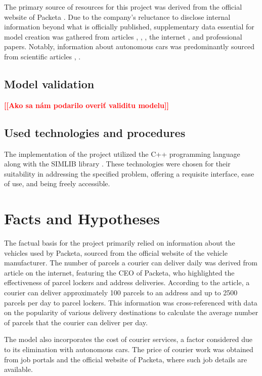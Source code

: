 \documentclass[a4paper, 11pt, a4paper]{article}
\newcommand{\todo}[1]{\textcolor{red}{\textbf{[[#1]]}}}
\begin{document}
The primary source of resources for this project was derived from the official website of Packeta \cite{packeta}.
Due to the company's reluctance to disclose internal information beyond what is officially published,
supplementary data essential for model creation was gathered from articles \cite{delivery.distance}, \cite{delivery.percentage},
\cite{parcels.num}, the internet \cite{peugeot}, and professional papers.
Notably, information about autonomous cars was predominantly sourced from scientific articles \cite{autonomous.emissions}, \cite{autonomous.models}.


\subsection{Model validation}

\noindent\todo{Ako sa nám podarilo overiť validitu modelu}


\subsection{Used technologies and procedures}

The implementation of the project utilized the C++ programming language along with the SIMLIB library \cite{SIMLIB}.
These technologies were chosen for their suitability in addressing the specified problem, offering a requisite interface,
ease of use, and being freely accessible.


\section{Facts and Hypotheses}

The factual basis for the project primarily relied on information about the vehicles used by Packeta, sourced from the official 
website of the vehicle manufacturer. The number of parcels a courier can deliver daily was derived from article \cite{parcels.num} on the internet, 
featuring the CEO of Packeta, who highlighted the effectiveness of parcel lockers and address deliveries. According to the article, 
a courier can deliver approximately 100 parcels to an address and up to 2500 parcels per day to parcel lockers. This information was 
cross-referenced with data on the popularity of various delivery destinations \cite{delivery.percentage} to calculate the average number of 
parcels that the courier can deliver per day.

The model also incorporates the cost of courier services, a factor considered due to its elimination with autonomous cars.
The price of courier work was obtained from job portals and the official website of Packeta, where such job details are available.
\end{document}
